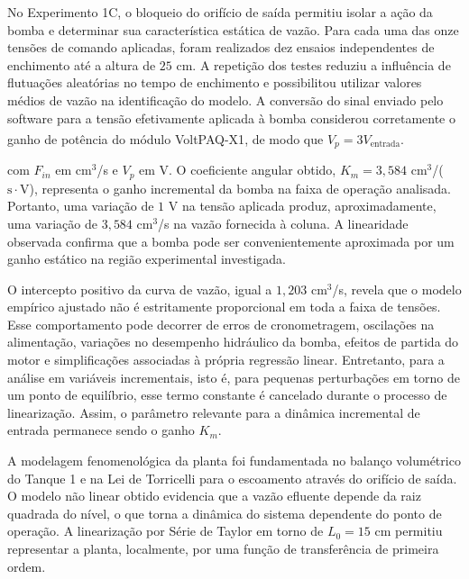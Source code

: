 \documentclass[a4paper,12pt]{article}
\begin{document}
\begin{justify}
    \hspace{4ex}No Experimento 1C, o bloqueio do orifício de saída permitiu isolar a ação da bomba e determinar sua característica estática de vazão. Para cada uma das onze tensões de comando aplicadas, foram realizados dez ensaios independentes de enchimento até a altura de $25$ cm. A repetição dos testes reduziu a influência de flutuações aleatórias no tempo de enchimento e possibilitou utilizar valores médios de vazão na identificação do modelo. A conversão do sinal enviado pelo software para a tensão efetivamente aplicada à bomba considerou corretamente o ganho de potência do módulo VoltPAQ-X1\textsuperscript{\textregistered}, de modo que $V_p=3V_{\text{entrada}}$.
\end{justify}

\begin{justify}
    \noindent com $F_{in}$ em cm$^3$/s e $V_p$ em V. O coeficiente angular obtido, $K_m=3{,}584$ cm$^3$/($\mathrm{s}\cdot\mathrm{V}$), representa o ganho incremental da bomba na faixa de operação analisada. Portanto, uma variação de $1$ V na tensão aplicada produz, aproximadamente, uma variação de $3{,}584$ cm$^3$/s na vazão fornecida à coluna. A linearidade observada confirma que a bomba pode ser convenientemente aproximada por um ganho estático na região experimental investigada.
\end{justify}

\begin{justify}
    \hspace{4ex}O intercepto positivo da curva de vazão, igual a $1{,}203$ cm$^3$/s, revela que o modelo empírico ajustado não é estritamente proporcional em toda a faixa de tensões. Esse comportamento pode decorrer de erros de cronometragem, oscilações na alimentação, variações no desempenho hidráulico da bomba, efeitos de partida do motor e simplificações associadas à própria regressão linear. Entretanto, para a análise em variáveis incrementais, isto é, para pequenas perturbações em torno de um ponto de equilíbrio, esse termo constante é cancelado durante o processo de linearização. Assim, o parâmetro relevante para a dinâmica incremental de entrada permanece sendo o ganho $K_m$.
\end{justify}

\begin{justify}
    \hspace{4ex}A modelagem fenomenológica da planta foi fundamentada no balanço volumétrico do Tanque 1 e na Lei de Torricelli para o escoamento através do orifício de saída. O modelo não linear obtido evidencia que a vazão efluente depende da raiz quadrada do nível, o que torna a dinâmica do sistema dependente do ponto de operação. A linearização por Série de Taylor em torno de $L_0=15$ cm permitiu representar a planta, localmente, por uma função de transferência de primeira ordem. 
\end{justify}
\end{document}
